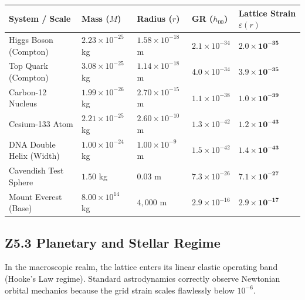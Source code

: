 \documentclass[11pt, letterpaper, openany]{book}
\begin{document}
\begin{center}
\renewcommand{\arraystretch}{1.2}
\small
\begin{tabular}{|p{3.8cm}|p{2cm}|p{2.2cm}|p{2cm}|p{2.5cm}|}
\hline
\rowcolor{kishblue!12}
\textbf{System / Scale} & \textbf{Mass ($M$)} & \textbf{Radius ($r$)} & \textbf{GR ($h_{00}$)} & \textbf{Lattice Strain $\varepsilon(r)$} \\
\hline
Higgs Boson (Compton) & $2.23 \times 10^{-25}$ kg & $1.58 \times 10^{-18}$ m & $2.1 \times 10^{-34}$ & $\mathbf{2.0 \times 10^{-35}}$ \\
\hline
Top Quark (Compton) & $3.08 \times 10^{-25}$ kg & $1.14 \times 10^{-18}$ m & $4.0 \times 10^{-34}$ & $\mathbf{3.9 \times 10^{-35}}$ \\
\hline
Carbon-12 Nucleus & $1.99 \times 10^{-26}$ kg & $2.70 \times 10^{-15}$ m & $1.1 \times 10^{-38}$ & $\mathbf{1.0 \times 10^{-39}}$ \\
\hline
Cesium-133 Atom & $2.21 \times 10^{-25}$ kg & $2.60 \times 10^{-10}$ m & $1.3 \times 10^{-42}$ & $\mathbf{1.2 \times 10^{-43}}$ \\
\hline
DNA Double Helix (Width) & $1.00 \times 10^{-24}$ kg & $1.00 \times 10^{-9}$ m & $1.5 \times 10^{-42}$ & $\mathbf{1.4 \times 10^{-43}}$ \\
\hline
Cavendish Test Sphere & $1.50$ kg & $0.03$ m & $7.3 \times 10^{-26}$ & $\mathbf{7.1 \times 10^{-27}}$ \\
\hline
Mount Everest (Base) & $8.00 \times 10^{14}$ kg & $4,000$ m & $2.9 \times 10^{-16}$ & $\mathbf{2.9 \times 10^{-17}}$ \\
\hline
\end{tabular}
\end{center}

\subsection*{Z5.3 Planetary and Stellar Regime}

In the macroscopic realm, the lattice enters its linear elastic operating band (Hooke's Law regime). Standard astrodynamics correctly observe Newtonian orbital mechanics because the grid strain scales flawlessly below $10^{-6}$.
\end{document}
